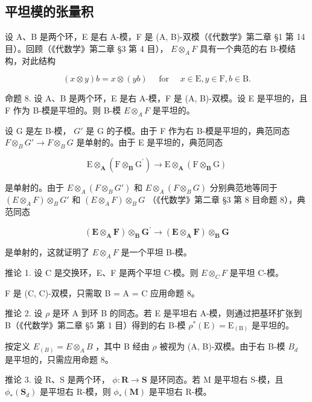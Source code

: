 \subsection{平坦模的张量积}

设 A、B 是两个环，E 是右 A-模，F 是 (A, B)-双模（《代数学》第二章 §1 第 14 目）。回顾（《代数学》第二章 §3 第 4 目）， \(E \otimes_{A} F\) 具有一个典范的右 B-模结构，对此结构

\[
(x \otimes y) b = x \otimes (y b) \quad \text {   for   } \quad x \in \mathrm{E}, y \in \mathrm{F}, b \in \mathrm{B}.
\]

命题 8. 设 A、B 是两个环，E 是右 A-模，F 是 (A, B)-双模。设 E 是平坦的，且 F 作为 B-模是平坦的。则 B-模 \(E \otimes_{A} F\) 是平坦的。

设 G 是左 B-模， \(G'\) 是 G 的子模。由于 F 作为右 B-模是平坦的，典范同态 \(F \otimes_{B} G' \to F \otimes_{B} G\) 是单射的。由于 E 是平坦的，典范同态

\[
\mathrm{E} \otimes_ {\mathbf {A}} (\mathrm{F} \otimes_ {\mathbf {B}} \mathrm{G} ^ {\prime}) \rightarrow \mathrm{E} \otimes_ {\mathbf {A}} (\mathrm{F} \otimes_ {\mathbf {B}} \mathrm{G})
\]

是单射的。由于 \(E \otimes_{A} (F \otimes_{B} G')\) 和 \(E \otimes_{A} (F \otimes_{B} G)\) 分别典范地等同于 \((E \otimes_{A} F) \otimes_{B} G'\) 和 \((E \otimes_{A} F) \otimes_{B} G\) （《代数学》第二章 §3 第 8 目命题 8），典范同态

\[
(\mathbf {E} \otimes_ {\mathbf {A}} \mathbf {F}) \otimes_ {\mathbf {B}} \mathbf {G} ^ {\prime} \rightarrow (\mathbf {E} \otimes_ {\mathbf {A}} \mathbf {F}) \otimes_ {\mathbf {B}} \mathbf {G}
\]

是单射的，这就证明了 \(E \otimes_{A} F\) 是一个平坦 B-模。

推论 1. 设 C 是交换环，E、F 是两个平坦 C-模。则 \(E \otimes_{C} F\) 是平坦 C-模。

F 是 (C, C)-双模，只需取 B = A = C 应用命题 8。

推论 2. 设 \(\rho\) 是环 A 到环 B 的同态。若 E 是平坦右 A-模，则通过把基环扩张到 B（《代数学》第二章 §5 第 1 目）得到的右 B-模 \(\rho^{*}(\mathrm{E}) = \mathrm{E}_{(\mathrm{B})}\) 是平坦的。

按定义 \(E_{(B)} = E \otimes_{A} B\) ，其中 B 经由 \(\rho\) 被视为 (A, B)-双模。由于右 B-模 \(B_{d}\) 是平坦的，只需应用命题 8。

推论 3. 设 R、S 是两个环， \(\phi: \mathbf{R} \to \mathbf{S}\) 是环同态。若 M 是平坦右 S-模，且 \(\phi_*(\mathbf{S}_d)\) 是平坦右 R-模，则 \(\phi_*(\mathbf{M})\) 是平坦右 R-模。

